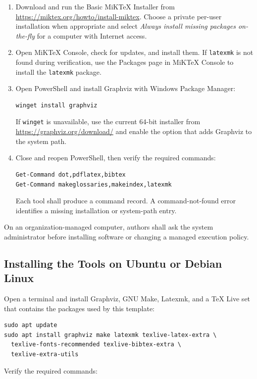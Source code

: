 \begin{enumerate}
  \item Download and run the Basic MiKTeX Installer from \url{https://miktex.org/howto/install-miktex}. Choose a private per-user installation when appropriate and select \emph{Always install missing packages on-the-fly} for a computer with Internet access.

  \item Open MiKTeX Console, check for updates, and install them. If \texttt{latexmk} is not found during verification, use the Packages page in MiKTeX Console to install the \texttt{latexmk} package.

  \item Open PowerShell and install Graphviz with Windows Package Manager:
\begin{verbatim}
winget install graphviz
\end{verbatim}
  If \texttt{winget} is unavailable, use the current 64-bit installer from \url{https://graphviz.org/download/} and enable the option that adds Graphviz to the system path.

  \item Close and reopen PowerShell, then verify the required commands:
\begin{verbatim}
Get-Command dot,pdflatex,bibtex
Get-Command makeglossaries,makeindex,latexmk
\end{verbatim}
  Each tool shall produce a command record. A command-not-found error identifies a missing installation or system-path entry.
\end{enumerate}

On an organization-managed computer, authors shall ask the system administrator
before installing software or changing a managed execution policy.

\subsection{Installing the Tools on Ubuntu or Debian Linux}

Open a terminal and install Graphviz, GNU Make, Latexmk, and a TeX Live set
that contains the packages used by this template:

\begin{verbatim}
sudo apt update
sudo apt install graphviz make latexmk texlive-latex-extra \
  texlive-fonts-recommended texlive-bibtex-extra \
  texlive-extra-utils
\end{verbatim}

Verify the required commands:

